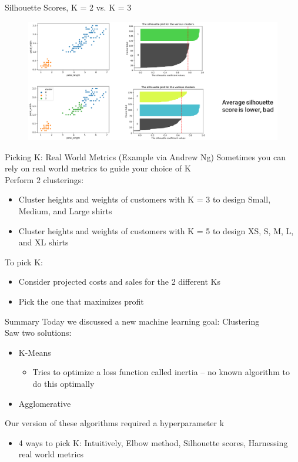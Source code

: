 \documentclass[aspectratio=169]{../latex_main/tntbeamer}  %
\begin{document}
	
	\begin{frame}{Silhouette Scores, K = 2 vs. K = 3}
	    \begin{figure}
	        \centering
	        \includegraphics[scale=.35]{Bild59}
	    \end{figure}
	\end{frame}
	
	
	\begin{frame}{Picking K: Real World Metrics (Example via Andrew Ng)}
	    Sometimes you can rely on real world metrics to guide your choice of K\\
	    \bigskip
	    Perform 2 clusterings:
	    \begin{itemize}
	        \item Cluster heights and weights of customers with K = 3 to design Small, Medium, and Large shirts
	        \item Cluster heights and weights of customers with K = 5 to design XS, S, M, L, and XL shirts
	    \end{itemize}
	    \bigskip
	    To pick K:
	    \begin{itemize}
	        \item Consider projected costs and sales for the 2 different Ks
	        \item Pick the one that maximizes profit
	    \end{itemize}
	\end{frame}
	
	
	\begin{frame}{Summary}
	    Today we discussed a new machine learning goal: Clustering\\
	    \bigskip
	    Saw two solutions:
	    \begin{itemize}
	        \item K-Means
	        \begin{itemize}
	            \item Tries to optimize a loss function called inertia -- no known algorithm to do this optimally
	        \end{itemize}
	        \item Agglomerative
	    \end{itemize}
	    \bigskip
	    Our version of these algorithms required a hyperparameter k
	    \begin{itemize}
	        \item 4 ways to pick K: Intuitively, Elbow method, Silhouette scores, Harnessing real world metrics
	    \end{itemize}
	\end{frame}
	
\end{document}
